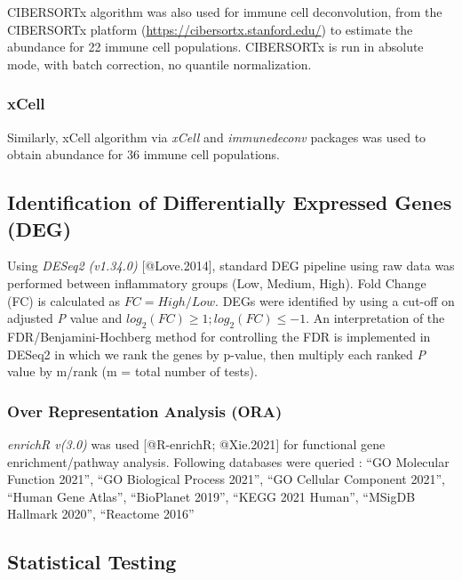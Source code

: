\documentclass[
]{article}
\begin{document}
CIBERSORTx algorithm was also used for immune cell deconvolution, from
the CIBERSORTx platform (\url{https://cibersortx.stanford.edu/}) to
estimate the abundance for 22 immune cell populations. CIBERSORTx is run
in absolute mode, with batch correction, no quantile normalization.

\hypertarget{xcell}{%
\subsubsection{xCell}\label{xcell}}

Similarly, xCell algorithm via \emph{xCell} and \emph{immunedeconv}
packages was used to obtain abundance for 36 immune cell populations.

\hypertarget{identification-of-differentially-expressed-genes-deg}{%
\subsection{Identification of Differentially Expressed Genes
(DEG)}\label{identification-of-differentially-expressed-genes-deg}}

Using \emph{DESeq2 (v1.34.0)} {[}@Love.2014{]}, standard DEG pipeline
using raw data was performed between inflammatory groups (Low, Medium,
High). Fold Change (FC) is calculated as \(FC = High/Low\). DEGs were
identified by using a cut-off on adjusted \emph{P} value  and
\(log_2(FC) \ge 1 ; log_2(FC) \le -1.\) An interpretation of the
FDR/Benjamini-Hochberg method for controlling the FDR is implemented in
DESeq2 in which we rank the genes by p-value, then multiply each ranked
\emph{P} value by m/rank (m = total number of tests).

\hypertarget{over-representation-analysis-ora}{%
\subsubsection{Over Representation Analysis
(ORA)}\label{over-representation-analysis-ora}}

\emph{enrichR v(3.0)} was used {[}@R-enrichR; @Xie.2021{]} for
functional gene enrichment/pathway analysis. Following databases were
queried : ``GO Molecular Function 2021'', ``GO Biological Process
2021'', ``GO Cellular Component 2021'', ``Human Gene Atlas'',
``BioPlanet 2019'', ``KEGG 2021 Human'', ``MSigDB Hallmark 2020'',
``Reactome 2016''

\hypertarget{statistical-testing}{%
\subsection{Statistical Testing}\label{statistical-testing}}
\end{document}
